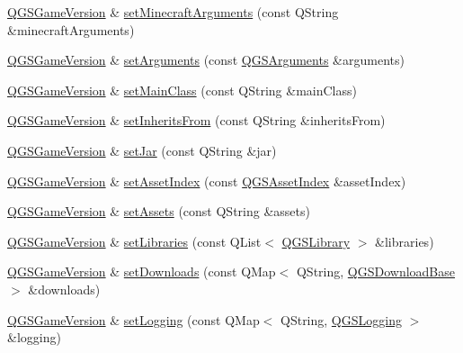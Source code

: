 \begin{DoxyCompactItemize}
\mbox{\hyperlink{class_q_g_s_game_version}{Q\+G\+S\+Game\+Version}} \& \mbox{\hyperlink{class_q_g_s_game_version_ae49a35203539517914af3329b0ac0c5b}{set\+Minecraft\+Arguments}} (const Q\+String \&minecraft\+Arguments)
\item 
\mbox{\hyperlink{class_q_g_s_game_version}{Q\+G\+S\+Game\+Version}} \& \mbox{\hyperlink{class_q_g_s_game_version_a51330a6a6ae0efc4e23fa043a9c337d7}{set\+Arguments}} (const \mbox{\hyperlink{class_q_g_s_arguments}{Q\+G\+S\+Arguments}} \&arguments)
\item 
\mbox{\hyperlink{class_q_g_s_game_version}{Q\+G\+S\+Game\+Version}} \& \mbox{\hyperlink{class_q_g_s_game_version_a005ff0cefb59b7e1bb0bf88c566d08e4}{set\+Main\+Class}} (const Q\+String \&main\+Class)
\item 
\mbox{\hyperlink{class_q_g_s_game_version}{Q\+G\+S\+Game\+Version}} \& \mbox{\hyperlink{class_q_g_s_game_version_ac8e5c395d78b8f5c728a3b856e686ca9}{set\+Inherits\+From}} (const Q\+String \&inherits\+From)
\item 
\mbox{\hyperlink{class_q_g_s_game_version}{Q\+G\+S\+Game\+Version}} \& \mbox{\hyperlink{class_q_g_s_game_version_afc34ab6f00d4703adab5bed636b332cb}{set\+Jar}} (const Q\+String \&jar)
\item 
\mbox{\hyperlink{class_q_g_s_game_version}{Q\+G\+S\+Game\+Version}} \& \mbox{\hyperlink{class_q_g_s_game_version_afefaf5aaf3654b674ee02dc446d93755}{set\+Asset\+Index}} (const \mbox{\hyperlink{class_q_g_s_asset_index}{Q\+G\+S\+Asset\+Index}} \&asset\+Index)
\item 
\mbox{\hyperlink{class_q_g_s_game_version}{Q\+G\+S\+Game\+Version}} \& \mbox{\hyperlink{class_q_g_s_game_version_afe221dac54bfa157fe60e9da40ba1096}{set\+Assets}} (const Q\+String \&assets)
\item 
\mbox{\hyperlink{class_q_g_s_game_version}{Q\+G\+S\+Game\+Version}} \& \mbox{\hyperlink{class_q_g_s_game_version_aff97722ab157feb2a51d416027e05d63}{set\+Libraries}} (const Q\+List$<$ \mbox{\hyperlink{class_q_g_s_library}{Q\+G\+S\+Library}} $>$ \&libraries)
\item 
\mbox{\hyperlink{class_q_g_s_game_version}{Q\+G\+S\+Game\+Version}} \& \mbox{\hyperlink{class_q_g_s_game_version_a201d8eb9bb2de306ed0bed76658548d8}{set\+Downloads}} (const Q\+Map$<$ Q\+String, \mbox{\hyperlink{class_q_g_s_download_base}{Q\+G\+S\+Download\+Base}} $>$ \&downloads)
\item 
\mbox{\hyperlink{class_q_g_s_game_version}{Q\+G\+S\+Game\+Version}} \& \mbox{\hyperlink{class_q_g_s_game_version_a0afd6d492b0e46c8d7b52bcd8bdfe822}{set\+Logging}} (const Q\+Map$<$ Q\+String, \mbox{\hyperlink{class_q_g_s_logging}{Q\+G\+S\+Logging}} $>$ \&logging)

\end{DoxyCompactItemize}
